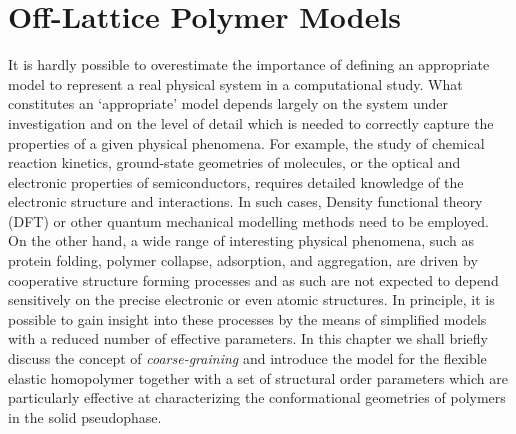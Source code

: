 \documentclass[12pt]{report}
\begin{document}



\chapter{Off-Lattice Polymer Models}
\label{chap:HomopolymerModel}
It is hardly possible to overestimate the importance of defining an appropriate model to represent a real physical system in a computational study. What constitutes an `appropriate' model depends largely on the system under investigation and on the level of detail which is needed to correctly capture the properties of a given physical phenomena. For example, the study of chemical reaction kinetics, ground-state geometries of molecules, or the optical and electronic properties of semiconductors, requires detailed knowledge of the electronic structure and interactions. In such cases, Density functional theory (DFT)\cite{Sholl2009} or other quantum mechanical modelling methods need to be employed. On the other hand, a wide range of interesting physical phenomena, such as protein folding, polymer collapse, adsorption, and aggregation, are driven by cooperative structure forming processes and as such are not expected to depend sensitively on the precise electronic or even atomic structures. In principle, it is possible to gain insight into these processes by the means of simplified models with a reduced number of effective parameters\cite{Bachmann2014,Schmid2011}. In this chapter we shall briefly discuss the concept of \textit{coarse-graining} and introduce the model for the flexible elastic homopolymer together with a set of structural order parameters which are particularly effective at characterizing the conformational geometries of polymers in the solid pseudophase.
\end{document}

